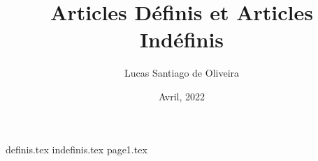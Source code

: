 \documentclass[12pt, twoside]{article}
\title{Articles Définis et Articles Indéfinis}
\author{Lucas Santiago de Oliveira}
\date{Avril, 2022}
\begin{document}
    \maketitle
    \vspace{2cm}
    \tableofcontents
    \newpage

    {definis.tex}
    \newpage
    {indefinis.tex}
    \newpage
    {page1.tex}
\end{document}
